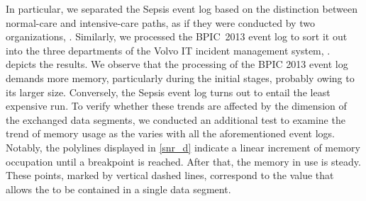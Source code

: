 In particular, we separated the Sepsis event log based on the distinction between normal-care and intensive-care paths, as if they were conducted by two  organizations, . Similarly, we processed the BPIC~2013 event log to sort it out into the three departments of the Volvo IT incident management system, . %
 depicts the results. We observe that the processing of the BPIC 2013 event log demands more memory, particularly during the initial stages, probably owing to its larger size. Conversely, the Sepsis event log turns out to entail the least expensive run. %
To verify whether these trends are affected by the dimension of the exchanged data segments, we conducted an additional test to examine the trend of memory usage as the {\SegSize} varies with all the aforementioned event logs. %
Notably, the polylines displayed in \cref{snr_d} indicate a linear increment of memory occupation until a breakpoint is reached. After that, the memory in use is steady. These points, marked by vertical dashed lines, correspond %
to the {\SegSize} value that allows the  to be contained in a single data segment.

